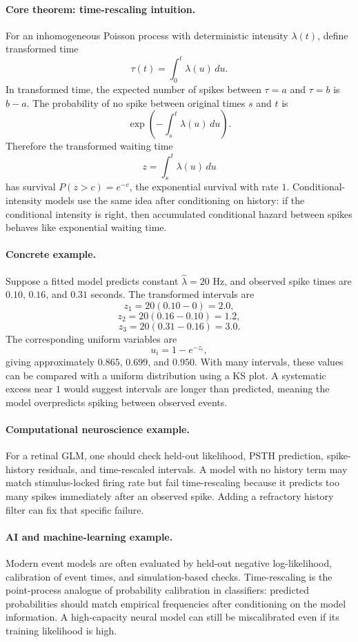 \paragraph{Core theorem: time-rescaling intuition.}
For an inhomogeneous Poisson process with deterministic intensity \(\lambda(t)\), define transformed time
\[
\tau(t)=\int_0^t\lambda(u)\,du.
\]
In transformed time, the expected number of spikes between \(\tau=a\) and \(\tau=b\) is \(b-a\). The probability of no spike between original times \(s\) and \(t\) is
\[
\exp\!\left(-\int_s^t\lambda(u)\,du\right).
\]
Therefore the transformed waiting time
\[
z=\int_s^t\lambda(u)\,du
\]
has survival \(P(z>c)=e^{-c}\), the exponential survival with rate \(1\). Conditional-intensity models use the same idea after conditioning on history: if the conditional intensity is right, then accumulated conditional hazard between spikes behaves like exponential waiting time.

\paragraph{Concrete example.}
Suppose a fitted model predicts constant \(\hat\lambda=20\) Hz, and observed spike times are \(0.10\), \(0.16\), and \(0.31\) seconds. The transformed intervals are
\[
z_1=20(0.10-0)=2.0,
\]
\[
z_2=20(0.16-0.10)=1.2,
\]
\[
z_3=20(0.31-0.16)=3.0.
\]
The corresponding uniform variables are
\[
u_i=1-e^{-z_i},
\]
giving approximately \(0.865\), \(0.699\), and \(0.950\). With many intervals, these values can be compared with a uniform distribution using a KS plot. A systematic excess near \(1\) would suggest intervals are longer than predicted, meaning the model overpredicts spiking between observed events.

\paragraph{Computational neuroscience example.}
For a retinal GLM, one should check held-out likelihood, PSTH prediction, spike-history residuals, and time-rescaled intervals. A model with no history term may match stimulus-locked firing rate but fail time-rescaling because it predicts too many spikes immediately after an observed spike. Adding a refractory history filter can fix that specific failure.

\paragraph{AI and machine-learning example.}
Modern event models are often evaluated by held-out negative log-likelihood, calibration of event times, and simulation-based checks. Time-rescaling is the point-process analogue of probability calibration in classifiers: predicted probabilities should match empirical frequencies after conditioning on the model information. A high-capacity neural model can still be miscalibrated even if its training likelihood is high.

